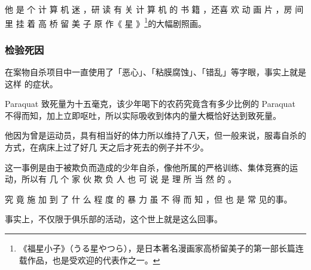 \documentclass[UTF8]{ctexart}
\begin{document}
他 是 个 计 算 机 迷 ，研 读 有 关 计 算 机 的 书 籍 ，还喜 欢 动 画 片 ，房 间 里 挂 着 高 桥 留 美 子 原 作《 星 》\footnote{《福星小子》（うる星やつら），是日本著名漫画家高桥留美子的第一部长篇连载作品，也是受欢迎的代表作之一。}的大幅剧照画。

\subsubsection*{检验死因}

在案物自杀项目中一直使用了「恶心」、「粘膜腐蚀」、「错乱」等字眼，事实上就是这样
的症状。

Paraquat 致死量为十五毫克，该少年喝下的农药究竟含有多少比例的 Paraquat
不得而知，加上立即呕吐，所以实际吸收到体内的量大概恰好达到致死量。

他因为曾是运动员，具有相当好的体力所以维持了八天，但一般来说，服毒自杀的方式，在病床上过了好几
天之后才死去的例子并不少。

这一事例是由于被欺负而造成的少年自杀，像他所属的严格训练、集体竞赛的运动，所以有 几 个 家 伙 欺 负 人 也 可 说 是 理 所 当 然 的 。

究 竟 施 加 到 了 什 么 程 度 的 暴 力 虽 不 得 而 知 ，但 也 是 常 见的事。

事实上，不仅限于俱乐部的活动，这个世上就是这么回事。
\end{document}
